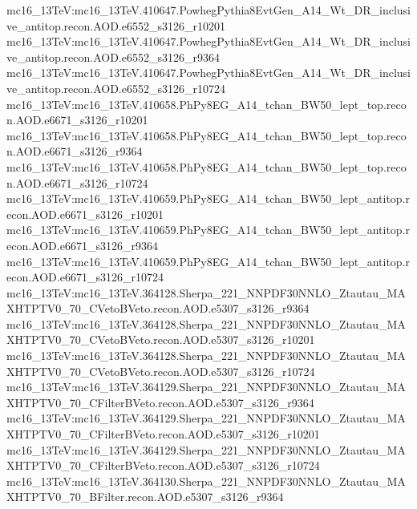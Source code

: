 { mc16\_13TeV:mc16\_13TeV.410647.PowhegPythia8EvtGen\_A14\_Wt\_DR\_inclusive\_antitop.recon.AOD.e6552\_s3126\_r10201\newline    
 mc16\_13TeV:mc16\_13TeV.410647.PowhegPythia8EvtGen\_A14\_Wt\_DR\_inclusive\_antitop.recon.AOD.e6552\_s3126\_r9364   \newline 
 mc16\_13TeV:mc16\_13TeV.410647.PowhegPythia8EvtGen\_A14\_Wt\_DR\_inclusive\_antitop.recon.AOD.e6552\_s3126\_r10724   \newline 
 mc16\_13TeV:mc16\_13TeV.410658.PhPy8EG\_A14\_tchan\_BW50\_lept\_top.recon.AOD.e6671\_s3126\_r10201   \newline 
 mc16\_13TeV:mc16\_13TeV.410658.PhPy8EG\_A14\_tchan\_BW50\_lept\_top.recon.AOD.e6671\_s3126\_r9364   \newline
 mc16\_13TeV:mc16\_13TeV.410658.PhPy8EG\_A14\_tchan\_BW50\_lept\_top.recon.AOD.e6671\_s3126\_r10724   \newline 
 mc16\_13TeV:mc16\_13TeV.410659.PhPy8EG\_A14\_tchan\_BW50\_lept\_antitop.recon.AOD.e6671\_s3126\_r10201   \newline 
 mc16\_13TeV:mc16\_13TeV.410659.PhPy8EG\_A14\_tchan\_BW50\_lept\_antitop.recon.AOD.e6671\_s3126\_r9364   \newline 
 mc16\_13TeV:mc16\_13TeV.410659.PhPy8EG\_A14\_tchan\_BW50\_lept\_antitop.recon.AOD.e6671\_s3126\_r10724   \newline 
 mc16\_13TeV:mc16\_13TeV.364128.Sherpa\_221\_NNPDF30NNLO\_Ztautau\_MAXHTPTV0\_70\_CVetoBVeto.recon.AOD.e5307\_s3126\_r9364\newline    
 mc16\_13TeV:mc16\_13TeV.364128.Sherpa\_221\_NNPDF30NNLO\_Ztautau\_MAXHTPTV0\_70\_CVetoBVeto.recon.AOD.e5307\_s3126\_r10201 \newline   
 mc16\_13TeV:mc16\_13TeV.364128.Sherpa\_221\_NNPDF30NNLO\_Ztautau\_MAXHTPTV0\_70\_CVetoBVeto.recon.AOD.e5307\_s3126\_r10724   \newline 
 mc16\_13TeV:mc16\_13TeV.364129.Sherpa\_221\_NNPDF30NNLO\_Ztautau\_MAXHTPTV0\_70\_CFilterBVeto.recon.AOD.e5307\_s3126\_r9364   \newline 
 mc16\_13TeV:mc16\_13TeV.364129.Sherpa\_221\_NNPDF30NNLO\_Ztautau\_MAXHTPTV0\_70\_CFilterBVeto.recon.AOD.e5307\_s3126\_r10201   \newline 
 mc16\_13TeV:mc16\_13TeV.364129.Sherpa\_221\_NNPDF30NNLO\_Ztautau\_MAXHTPTV0\_70\_CFilterBVeto.recon.AOD.e5307\_s3126\_r10724 \newline   
 mc16\_13TeV:mc16\_13TeV.364130.Sherpa\_221\_NNPDF30NNLO\_Ztautau\_MAXHTPTV0\_70\_BFilter.recon.AOD.e5307\_s3126\_r9364 \newline   
}
